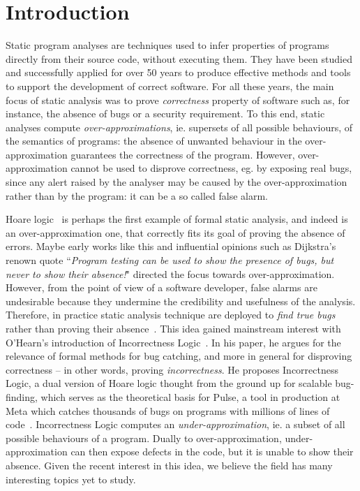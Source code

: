 
\chapter{Introduction}\label{ch:intro}
Static program analyses are techniques used to infer properties of programs directly from their source code, without executing them. They have been studied and successfully applied for over 50 years to produce effective methods and tools to support the development of correct software.
For all these years, the main focus of static analysis was to prove \emph{correctness} property of software such as, for instance, the absence of bugs or a security requirement. To this end, static analyses compute \emph{over-approximations}, ie. supersets of all possible behaviours, of the semantics of programs: the absence of unwanted behaviour in the over-approximation guarantees the correctness of the program. However, over-approximation cannot be used to disprove correctness, eg. by exposing real bugs, since any alert raised by the analyser may be caused by the over-approximation rather than by the program: it can be a so called false alarm.

Hoare logic~\cite{Hoare69} is perhaps the first example of formal static analysis, and indeed is an over-approximation one, that correctly fits its goal of proving the absence of errors. Maybe early works like this and influential opinions such as Dijkstra's renown quote ``\textit{Program testing can be used to show the presence of bugs, but never to show their absence!}" \cite{EWD249} directed the focus towards over-approximation.
However, from the point of view of a software developer, false alarms are undesirable because they undermine the credibility and usefulness of the analysis. Therefore, in practice static analysis technique are deployed to \emph{find true bugs} rather than proving their absence~\cite{BKY05}.
This idea gained mainstream interest with O'Hearn's introduction of Incorrectness Logic~\cite{OHearn20}. In his paper, he argues for the relevance of formal methods for bug catching, and more in general for disproving correctness -- in other words, proving \emph{incorrectness}. He proposes Incorrectness Logic, a dual version of Hoare logic thought from the ground up for scalable bug-finding, which serves as the theoretical basis for Pulse, a tool in production at Meta which catches thousands of bugs on programs with millions of lines of code~\cite{DFLO19}.
Incorrectness Logic computes an \emph{under-approximation}, ie. a subset of all possible behaviours of a program. Dually to over-approximation, under-approximation can then expose defects in the code, but it is unable to show their absence.
Given the recent interest in this idea, we believe the field has many interesting topics yet to study.

